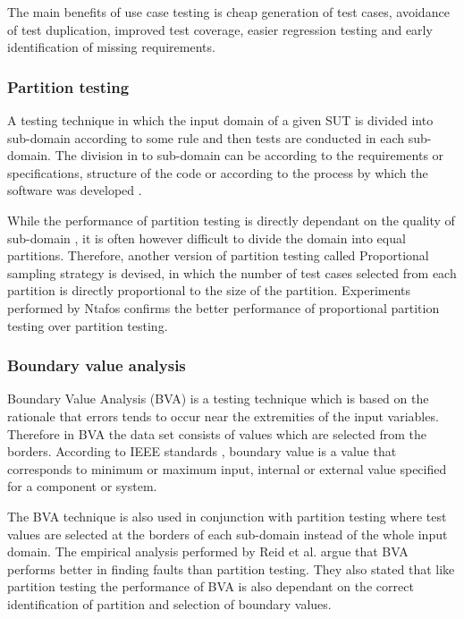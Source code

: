The main benefits of use case testing is cheap generation of test cases, avoidance of test duplication, improved test coverage, easier regression testing and early identification of missing requirements.  

\subsubsection{Partition testing}
A testing technique in which the input domain of a given SUT is divided into sub-domain according to some rule and then tests are conducted in each sub-domain. The division in to sub-domain can be according to the requirements or specifications, structure of the code or according to the process by which the software was developed \cite{hamlet1990}. 

While the performance of partition testing is directly dependant on the quality of sub-domain \cite{weyuker1991analyzing}, it is often however difficult to divide the domain into equal partitions. Therefore, another version of partition testing called Proportional sampling strategy \cite{Chan1996} is devised, in which the number of test cases selected from each partition is directly proportional to the size of the partition. Experiments performed by Ntafos \cite{ntafos1998random} confirms the better performance of proportional partition testing over partition testing.


\subsubsection{Boundary value analysis}
Boundary Value Analysis (BVA) is a testing technique which is based on the rationale that errors tends to occur near the extremities of the input variables. Therefore in BVA the data set consists of values which are selected from the borders. According to IEEE standards \cite{radatz1990ieee}, boundary value is a value that corresponds to minimum or maximum input, internal or external value specified for a component or system. 

The BVA technique is also used in conjunction with partition testing where test values are selected at the borders of each sub-domain instead of the whole input domain. The empirical analysis performed by Reid et al. \cite{reid1997empirical} argue that BVA performs better in finding faults than partition testing. They also stated that like partition testing the performance of BVA is also dependant on the correct identification of partition and selection of boundary values.

